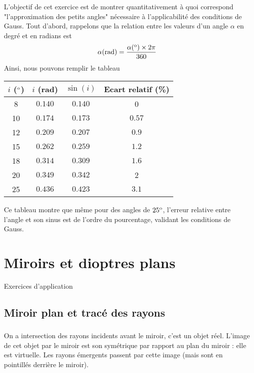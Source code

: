 \documentclass[10pt,a5paper,notitlepage]{book}
\begin{document}
L'objectif de cet exercice est de montrer quantitativement à quoi correspond "l'approximation des petits angles" nécessaire à l'applicabilité des conditions de Gauss. Tout d'abord, rappelons que la relation entre les valeurs d'un angle $\alpha$ en degré et en radians est
\begin{equation}
	\alpha({\rm rad}) = \dfrac{\alpha(^{\rm o})\times 2\pi}{360}
\end{equation}
Ainsi, nous pouvons remplir le tableau
\begin{table*}[h!]
	\centering
	\begin{tabular}{|c|c|c|c|}
		\hline
		$i$ ($^{\rm o}$) & $i$ (rad) & $\sin(i)$ & Ecart relatif (\%) \\
		\hline
		8 & $0.140$ & $0.140$ & 0 \\
		\hline
		10 & $0.174$ & $0.173$ & $0.57$ \\
		\hline
		12 & $0.209$ & $0.207$ & $0.9$ \\
		\hline
		15 & $0.262$ & $0.259$ & $1.2$ \\
		\hline
		18 & $0.314$ & $0.309$ & $1.6$ \\
		\hline
		20 & $0.349$ & $0.342$ & 2 \\
		\hline
		25 & $0.436$ & $0.423$ & $3.1$ \\
		\hline
	\end{tabular}
\end{table*}
Ce tableau montre que même pour des angles de $25^{\rm o}$, l'erreur relative entre l'angle et son sinus est de l'ordre du pourcentage, validant les conditions de Gauss.

\theendnotes

\chapter{Miroirs et dioptres plans}
\vspace*{-47pt}
\begin{center}
    \Huge Exercices d'application
\end{center}

\section{Miroir plan et tracé des rayons}
\subsection{}
On a intersection des rayons incidents avant le miroir, c'est un objet réel.
L'image de cet objet par le miroir est son symétrique par rapport au plan du
miroir : elle est virtuelle. Les rayons émergents passent par cette image (mais
sont en pointillés derrière le miroir).
\end{document}
